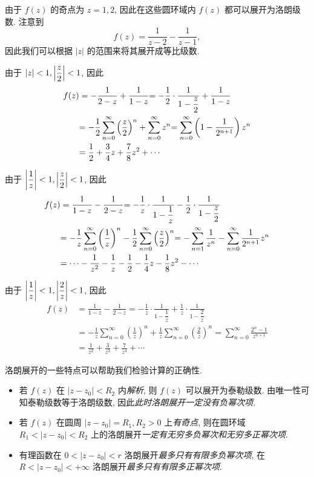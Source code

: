 \begin{solution}
	由于 $f(z)$ 的奇点为 $z=1,2$, 因此在这些圆环域内 $f(z)$ 都可以展开为洛朗级数.
	{注意到
		\[f(z)=\frac1{z-2}-\frac1{z-1},\]
		因此我们可以根据 $|z|$ 的范围来将其展开成等比级数.}

	 由于 $|z|<1,\left|\dfrac z2\right|<1$,
	{因此
		\begin{align*}
			f(z)&=-\frac1{2-z}+\frac1{1-z}
			{=-\frac{1}{2}\cdot\frac1{1-\dfrac z2}+\frac1{1-z}}\\
			&{=-\frac{1}{2}\sum_{n=0}^\infty\left(\frac z2\right)^n+\sum_{n=0}^\infty z^n}
			{=\sum_{n=0}^\infty\left(1-\frac1{2^{n+1}}\right)z^n}\\
			&{=\frac{1}{2} +\frac34z+\frac78z^2+\cdots}
		\end{align*}}

	 由于 $\left|\dfrac1z\right|<1,\left|\dfrac z2\right|<1$, 
	{因此
		\begin{align*}
			f(z)&=\frac1{1-z}-\frac1{2-z}
			{=-\frac1z\cdot\frac1{1-\dfrac1z}-\frac{1}{2}\cdot\frac1{1-\dfrac z2}}\\
			&{=-\frac1z\sum_{n=0}^\infty \left(\frac1z\right)^n-\frac{1}{2}\sum_{n=0}^\infty\left(\frac z2\right)^n}
			{=-\sum_{n=1}^{\infty}\frac1{z^n}-\sum_{n=0}^\infty\frac1{2^{n+1}}z^n}\\
			&{=\cdots-\frac1{z^2}-\frac1z-\frac{1}{2} -\frac14z-\frac18z^2-\cdots}
		\end{align*}}

	 由于 $\left|\dfrac1z\right|<1,\left|\dfrac2z\right|<1$, {因此
		\begin{align*}
			f(z)&=\frac1{1-z}-\frac1{2-z}
				{=-\frac1z\cdot\frac1{1-\dfrac1z}+\frac1z\cdot\frac1{1-\dfrac2z}}\\
			&{=-\frac1z\sum_{n=0}^\infty \left(\frac1z\right)^n+\frac1z\sum_{n=0}^\infty\left(\frac2z\right)^n}
				{=\sum_{n=0}^\infty\frac{2^n-1}{z^{n+1}}}\\
			&{=\frac1{z^2}+\frac3{z^3}+\frac7{z^4}+\cdots}
		\end{align*}}
\end{solution}

洛朗展开的一些特点可以帮助我们检验计算的正确性.
\begin{itemize}
	\item  若 $f(z)$ 在 $|z-z_0|<R_2$ 内\emph{解析},
		则 $f(z)$ 可以展开为泰勒级数.
		由唯一性可知泰勒级数等于洛朗级数,
		因此\emph{此时洛朗展开一定没有负幂次项}.
	\item 若 $f(z)$ 在圆周 $|z-z_0|=R_1,R_2>0$ 上\emph{有奇点}, 则在圆环域 $R_1<|z-z_0|<R_2$ 上的洛朗展开\emph{一定有无穷多负幂次和无穷多正幂次项}.
	\item 有理函数在 $0<|z-z_0|<r$ 洛朗展开\emph{最多只有有限多负幂次项}, 在 $R<|z-z_0|<+\infty$ 洛朗展开\emph{最多只有有限多正幂次项}.
\end{itemize}

